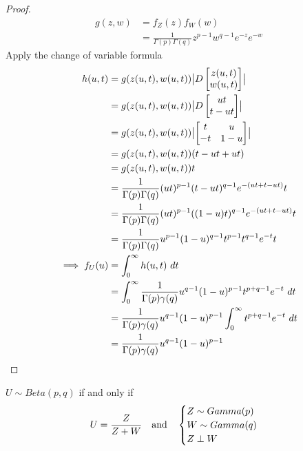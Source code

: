 \documentclass{article}
\begin{document}
   	\begin{proof}
   		\begin{align}
   			g(z, w) &= f_Z(z) f_W(w) \\
   			&= \frac{1}{\Gamma(p) \Gamma(q)} z^{p-1} w^{q-1} e^{-z} e^{-w}
   		\end{align}
   		Apply the change of variable formula 
   		\begin{align}
   			h(u, t) &= g(z(u, t), w(u, t)) \big \vert {D \begin{bmatrix}
   				z(u, t) \\ w(u, t)
   			\end{bmatrix}} \big \vert \\
   			&= g(z(u, t), w(u, t)) 
   			\big \vert {D \begin{bmatrix}
 				ut \\ t - ut
 			\end{bmatrix}} \big \vert \\
 			&= g(z(u, t), w(u, t)) 
   			\big \vert {\begin{bmatrix}
 				t & u \\
 				-t & 1 - u
 			\end{bmatrix}} \big \vert \\
 			&= g(z(u, t), w(u, t)) (t - ut + ut) \\
 			&= g(z(u, t), w(u, t)) t \\
 			&= \frac{1}{\Gamma(p) \Gamma(q)} (ut)^{p-1} (t - ut)^{q-1} e^{-(ut + t - ut)} t \\
 			&= \frac{1}{\Gamma(p) \Gamma(q)} (ut)^{p-1} ((1-u)t)^{q-1} e^{-(ut + t - ut)} t \\
 			&= \frac{1}{\Gamma(p) \Gamma(q)} u^{p-1} (1-u)^{q-1} t^{p-1} t^{q-1} e^{-t} t \\
 			\implies f_U(u) &= \int_0^\infty h(u, t)\ dt \\
 			&= \int_0^\infty \frac{1}{\Gamma(p) \gamma(q)} u^{q-1} (1-u)^{p-1} t^{p+q-1} e^{-t}\ dt \\
 			&= \frac{1}{\Gamma(p) \gamma(q)} u^{q-1} (1-u)^{p-1} \int_0^\infty t^{p+q-1} e^{-t}\ dt \\
 			&= \frac{1}{\Gamma(p) \gamma(q)} u^{q-1} (1-u)^{p-1}
   		\end{align}
   	\end{proof}
		
	\begin{definition}
		$U \sim Beta(p, q)$ if and only if
		\begin{align}
			U = \frac{Z}{Z+W}\quad \text{{and}} \quad
			\begin{cases}
				Z \sim Gamma(p) \\
				W \sim Gamma(q) \\
				Z \perp W
			\end{cases}
		\end{align}
	\end{definition}
	
\end{document}
